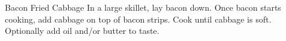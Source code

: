 \documentclass[../main.tex]{subfiles}
\begin{document}
\begin{recipe}{Bacon Fried Cabbage}{}{}
    In a large skillet, lay bacon down.
    Once bacon starts cooking, add cabbage on
    top of bacon strips. Cook until cabbage is soft.
    Optionally add oil and/or butter to taste.

\end{recipe}
\end{document}

